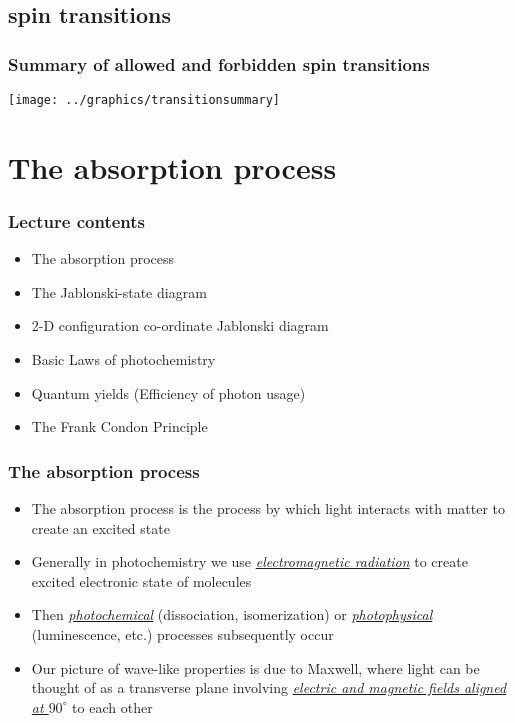 \documentclass[a4paper,12pt,titlepage]{article}
\begin{document}
\subsection{spin transitions}

\begin{frame}
\frametitle{Summary of allowed and forbidden spin transitions}
\begin{center}
\texttt{[image: ../graphics/transitionsummary]}
\end{center}
\end{frame}
	

\section{The absorption process}
	\begin{frame}
	\frametitle{Lecture contents}
		\begin{itemize}
			\item The absorption process
			\item The Jablonski-state diagram
			\item 2-D configuration co-ordinate Jablonski diagram
			\item Basic Laws of photochemistry
			\item Quantum yields (Efficiency of photon usage)
			\item The Frank Condon Principle
		\end{itemize}
	\end{frame}
	
\begin{frame}[<+->]
\frametitle{The absorption process}
\begin{itemize}
\item The absorption process is the process by which light interacts with matter to create an excited state
\item Generally in photochemistry we use \textit{\underline{electromagnetic radiation}} to create excited electronic state of molecules
\item Then \textit{\underline{photochemical}} (dissociation, isomerization) or \textit{\underline{photophysical}} (luminescence, etc.) processes subsequently occur
\item Our picture of wave-like properties is due to Maxwell, where light can be thought of as a transverse plane involving \textit{\underline{electric and magnetic fields aligned at \(90^\circ\)}} to each other
\end{itemize}
\end{frame}
\end{document}
